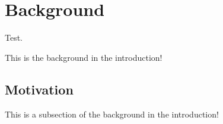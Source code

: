 \section{Background\label{introduction:background}}
Test.

This is the background in the introduction!

\subsection{Motivation\label{sec:introduction:motivation}}


This is a subsection of the background in the introduction!
